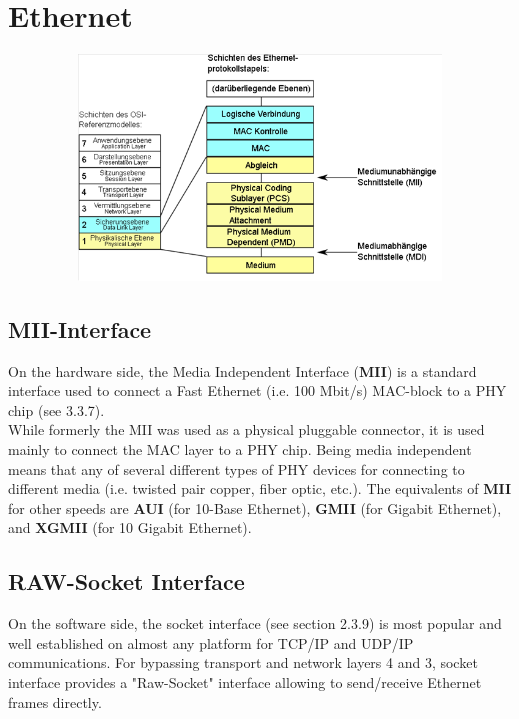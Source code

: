 \section{Ethernet}

    \begin{figure}[h]
    \centering
    \includegraphics[width=12cm, height=6cm]{Images/image56.png}
    \label{fig:Fig 153}
    \end{figure}

\subsection{MII-Interface}

On the hardware side, the Media Independent Interface (\textbf{MII}) is a standard interface used to connect a Fast Ethernet (i.e. 100 Mbit/s) MAC-block to a PHY chip (see 3.3.7). \\

While formerly the MII was used as a physical pluggable connector, it is used mainly to connect the MAC layer to a PHY chip. Being media independent means that any of several different types of PHY devices for connecting to different media (i.e. twisted pair copper, fiber optic, etc.). The equivalents of \textbf{MII} for other speeds are \textbf{AUI} (for 10-Base Ethernet), \textbf{GMII} (for Gigabit Ethernet), and \textbf{XGMII} (for 10 Gigabit Ethernet).

\subsection{RAW-Socket Interface}

On the software side, the socket interface (see section 2.3.9) is most popular and well established on almost any platform for TCP/IP and UDP/IP communications. For bypassing transport and network layers 4 and 3, socket interface provides  a "Raw-Socket" interface allowing to send/receive Ethernet frames directly.\\

